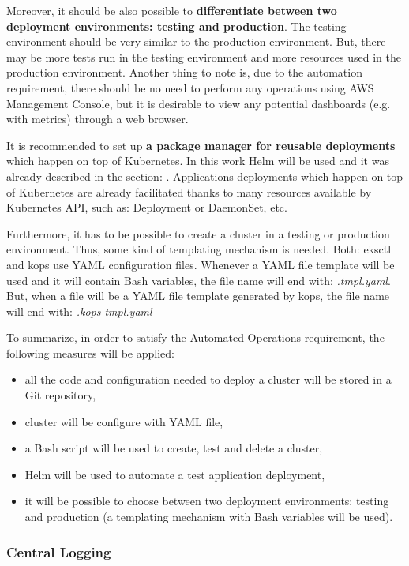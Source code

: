 Moreover, it should be also possible to \textbf{differentiate between two deployment environments: testing and production}. The testing environment should be very similar to the production environment. But, there may be more tests run in the testing environment and more resources used in the production environment. Another thing to note is, due to the automation requirement, there should be no need to perform any operations using AWS Management Console, but it is desirable to view any potential dashboards (e.g. with metrics) through a web browser.

It is recommended to set up \textbf{a package manager for reusable deployments} which happen on top of Kubernetes\cite{gruntwork-howto-blog}. In this work Helm will be used and it was already described in the section: . Applications deployments which happen on top of Kubernetes are already facilitated thanks to many resources available by Kubernetes API, such as: Deployment\cite{k8s-resources-depl} or DaemonSet\cite{k8s-resources-ds}, etc.

Furthermore, it has to be possible to create a cluster in a testing or production environment. Thus, some kind of templating mechanism is needed. Both: eksctl and kops use YAML configuration files. Whenever a YAML file template will be used and it will contain Bash variables, the file name will end with: \textit{.tmpl.yaml}. But, when a file will be a YAML file template generated by kops, the file name will end with: \textit{.kops-tmpl.yaml}

To summarize, in order to satisfy the Automated Operations requirement, the following measures will be applied:
\begin{itemize}
\item all the code and configuration needed to deploy a cluster will be stored in a Git repository,
\item cluster will be configure with YAML file,
\item a Bash script will be used to create, test and delete a cluster,
\item Helm will be used to automate a test application deployment,
\item it will be possible to choose between two deployment environments: testing and production (a templating mechanism with Bash variables will be used).
\end{itemize}


\subsubsection{Central Logging}

